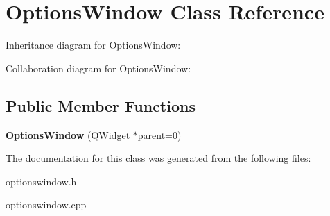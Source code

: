 \hypertarget{class_options_window}{}\section{Options\+Window Class Reference}
\label{class_options_window}


Inheritance diagram for Options\+Window\+:


Collaboration diagram for Options\+Window\+:
\subsection*{Public Member Functions}
\begin{DoxyCompactItemize}
\item 
\hypertarget{class_options_window_ac7ba16f211c07e2114015407c722840b}{}{\bfseries Options\+Window} (Q\+Widget $\ast$parent=0)\label{class_options_window_ac7ba16f211c07e2114015407c722840b}

\end{DoxyCompactItemize}


The documentation for this class was generated from the following files\+:\begin{DoxyCompactItemize}
\item 
optionswindow.\+h\item 
optionswindow.\+cpp\end{DoxyCompactItemize}
